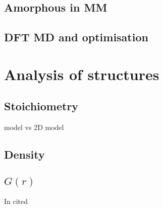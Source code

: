 \subsection{Amorphous \texorpdfstring{}{AlOₓ} in MM}
\subsection{DFT MD and optimisation}
\section{Analysis of structures}
%
%
%

\subsection{Stoichiometry}
 model vs 2D model
\subsection{Density}
\subsection{\texorpdfstring{$G(r)$}{G(r)}}
In cited \cite{Xu1997} 
